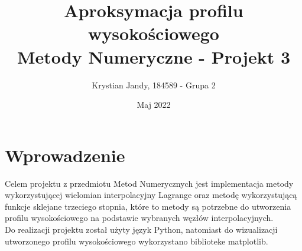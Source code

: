 \documentclass[12pt]{extarticle}
\begin{document}
\title{
    Aproksymacja profilu wysokościowego \\
    \large Metody Numeryczne - Projekt 3
}

\author{Krystian Jandy, 184589 - Grupa 2}
\date{Maj 2022}

\maketitle

\section*{Wprowadzenie}
 Celem projektu z przedmiotu Metod Numerycznych jest implementacja metody wykorzystującej wielomian interpolacyjny Lagrange oraz metodę wykorzystującą funkcje sklejane trzeciego stopnia, które to metody są potrzebne do utworzenia profilu wysokościowego na podstawie wybranych węzłów interpolacyjnych.\\
 Do realizacji projektu został użyty język Python, natomiast do wizualizacji utworzonego profilu wysokościowego wykorzystano biblioteke matplotlib.
\end{document}
